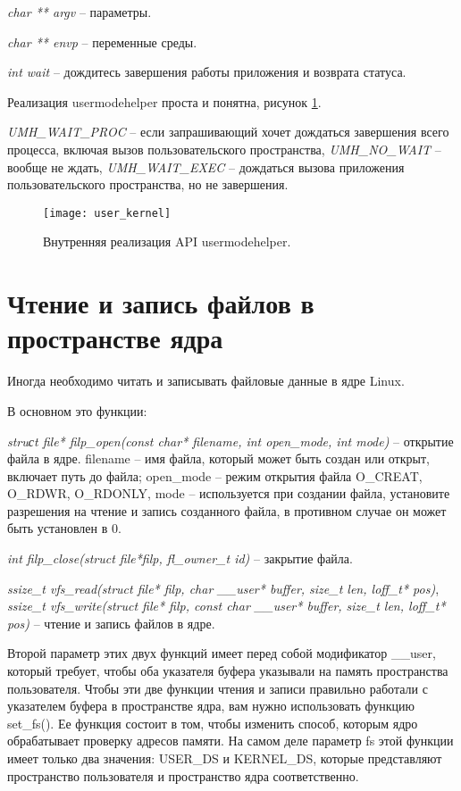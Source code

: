 \textit{char ** argv} -- параметры.

\textit{char ** envp} --  переменные среды.

\textit{int wait}  -- дождитесь завершения работы приложения и возврата статуса.

Реализация usermodehelper проста и понятна, рисунок \ref{img:user_kernel}.

\textit{UMH\_WAIT\_PROC} -- если запрашивающий хочет дождаться завершения всего процесса, включая вызов пользовательского пространства, \textit{UMH\_NO\_WAIT} -- вообще не ждать, \textit{UMH\_WAIT\_EXEC} -- дождаться вызова приложения пользовательского пространства, но не завершения.

\begin{figure}[H]
	\centering
	\texttt{[image: user\_kernel]}
	\caption{Внутренняя реализация API usermodehelper. }
	\label{img:user_kernel}
\end{figure}

\section{\textbf{Чтение и запись файлов в пространстве ядра}}

Иногда необходимо читать и записывать файловые данные в ядре Linux. \cite{read_write}

В основном это функции: 

\textit{struсt file* filp\_open(const char* filename, int open\_mode, int mode)} -- открытие файла в ядре. filename -- имя файла, который может быть создан или открыт, включает путь до файла; open\_mode -- режим открытия файла O\_CREAT, O\_RDWR, O\_RDONLY, mode -- используется при создании файла, установите разрешения на чтение и запись созданного файла, в противном случае он может быть установлен в 0.

\textit{int filp\_close(struct file*filp, fl\_owner\_t id)} -- закрытие файла.
 
\textit{ssize\_t vfs\_read(struct file* filp, char \_\_user* buffer, size\_t len, loff\_t* pos)}, \textit{ssize\_t vfs\_write(struct file* filp, const char \_\_user* buffer, size\_t len, loff\_t* pos)} -- чтение и запись файлов в ядре.

Второй параметр этих двух функций имеет перед собой модификатор \_\_user, который требует, чтобы оба указателя буфера указывали на память пространства пользователя. Чтобы эти две функции чтения и записи правильно работали с указателем буфера в пространстве ядра, вам нужно использовать функцию set\_fs(). Ее функция состоит в том, чтобы изменить способ, которым ядро обрабатывает проверку адресов памяти. На самом деле параметр fs этой функции имеет только два значения: USER\_DS и KERNEL\_DS, которые представляют пространство пользователя и пространство ядра соответственно.

